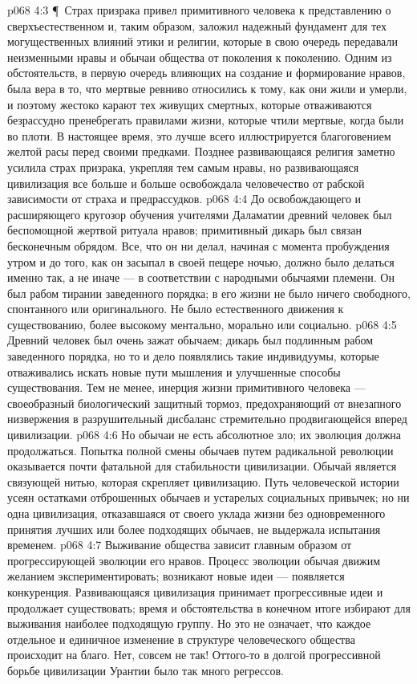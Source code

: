 \vs p068 4:3 \P\ Страх призрака привел примитивного человека к представлению о сверхъестественном и, таким образом, заложил надежный фундамент для тех могущественных влияний этики и религии, которые в свою очередь передавали неизменными нравы и обычаи общества от поколения к поколению. Одним из обстоятельств, в первую очередь влияющих на создание и формирование нравов, была вера в то, что мертвые ревниво относились к тому, как они жили и умерли, и поэтому жестоко карают тех живущих смертных, которые отваживаются безрассудно пренебрегать правилами жизни, которые чтили мертвые, когда были во плоти. В настоящее время, это лучше всего иллюстрируется благоговением желтой расы перед своими предками. Позднее развивающаяся религия заметно усилила страх призрака, укрепляя тем самым нравы, но развивающаяся цивилизация все больше и больше освобождала человечество от рабской зависимости от страха и предрассудков.
\vs p068 4:4 До освобождающего и расширяющего кругозор обучения учителями Даламатии древний человек был беспомощной жертвой ритуала нравов; примитивный дикарь был связан бесконечным обрядом. Все, что он ни делал, начиная с момента пробуждения утром и до того, как он засыпал в своей пещере ночью, должно было делаться именно так, а не иначе --- в соответствии с народными обычаями племени. Он был рабом тирании заведенного порядка; в его жизни не было ничего свободного, спонтанного или оригинального. Не было естественного движения к существованию, более высокому ментально, морально или социально.
\vs p068 4:5 Древний человек был очень зажат обычаем; дикарь был подлинным рабом заведенного порядка, но то и дело появлялись такие индивидуумы, которые отваживались искать новые пути мышления и улучшенные способы существования. Тем не менее, инерция жизни примитивного человека --- своеобразный биологический защитный тормоз, предохраняющий от внезапного низвержения в разрушительный дисбаланс стремительно продвигающейся вперед цивилизации.
\vs p068 4:6 Но обычаи не есть абсолютное зло; их эволюция должна продолжаться. Попытка полной смены обычаев путем радикальной революции оказывается почти фатальной для стабильности цивилизации. Обычай является связующей нитью, которая скрепляет цивилизацию. Путь человеческой истории усеян остатками отброшенных обычаев и устарелых социальных привычек; но ни одна цивилизация, отказавшаяся от своего уклада жизни без одновременного принятия лучших или более подходящих обычаев, не выдержала испытания временем.
\vs p068 4:7 Выживание общества зависит главным образом от прогрессирующей эволюции его нравов. Процесс эволюции обычая движим желанием экспериментировать; возникают новые идеи --- появляется конкуренция. Развивающаяся цивилизация принимает прогрессивные идеи и продолжает существовать; время и обстоятельства в конечном итоге избирают для выживания наиболее подходящую группу. Но это не означает, что каждое отдельное и единичное изменение в структуре человеческого общества происходит на благо. Нет, совсем не так! Оттого\hyp{}то в долгой прогрессивной борьбе цивилизации Урантии было так много регрессов.
